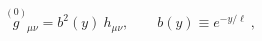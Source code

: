 \begin{equation}
\overset{(0)}{g}{}_{\mu\nu} = b^2(y)~h_{\mu\nu}, \qquad 
b(y)\equiv e^{- y/ \ell} \ ,
\label{formal:metric}
\end{equation}

